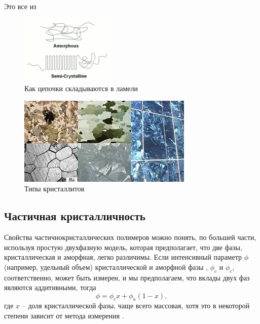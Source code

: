 Это все из \cite{cryst1}

	\begin{figure} 
\vspace{-20pt}


  \begin{center}
    \includegraphics[width=0.4\textwidth]{fig/crystal-1.png}
    \caption{Как цепочки складываются в ламели}
    \label{fig:crystal-1}
  \end{center}
  \vspace{-20pt}
  \vspace{1pt}
\end{figure}



\begin{figure}[h]
    \includegraphics[width=\textwidth]{fig/crystallites.jpg}
    \caption{Типы кристаллитов}
    \label{fig:crystallites}
\end{figure}



\subsection{Частичная кристалличность}

Свойства частичнокристаллических полимеров можно понять, по большей части,
используя простую двухфазную модель, которая предполагает, что две фазы, кристаллическая и аморфная, легко различимы. Если интенсивный параметр  $\phi$ (например, удельный объем) кристаллической и аморфной фазы , $\phi_c$ и $\phi_c$, соответственно, может быть измерен, и мы предполагаем, что вклады двух фаз являются аддитивными, тогда
\[ 
\phi = \phi_c x + \phi_a(1-x),
\]
где $x$  -- доля кристаллической фазы, чаще всего массовая, хотя это в некоторой степени зависит от метода измерения \cite{cryst3}.

